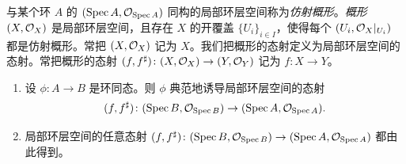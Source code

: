 与某个环 $A$ 的 $(\operatorname{Spec} A,\mathcal{O}_{\operatorname{Spec} A})$ 同构的局部环层空间称为\emph{仿射概形}。\emph{概形} $(X,\mathcal{O}_X)$ 是局部环层空间，且存在 $X$ 的开覆盖 $\{U_i\}_{i\in I}$，使得每个 $(U_i,\mathcal{O}_X|_{U_i})$ 都是仿射概形。常把 $(X,\mathcal{O}_X)$ 记为 $X$。我们把概形的态射定义为局部环层空间的态射。常把概形的态射 $(f,f^\sharp)\colon(X,\mathcal{O}_X)\to(Y,\mathcal{O}_Y)$ 记为 $f\colon X\to Y$。

\begin{proposition}\label{it:1.2.5}
\begin{enumerate}[label=(\roman*)]
  \item 设 $\phi\colon A\to B$ 是环同态。则 $\phi$ 典范地诱导局部环层空间的态射
  \[
  (f,f^\sharp)\colon(\operatorname{Spec} B,\mathcal{O}_{\operatorname{Spec} B})\to(\operatorname{Spec} A,\mathcal{O}_{\operatorname{Spec} A}).
  \]
  \item 局部环层空间的任意态射 $(f,f^\sharp)\colon(\operatorname{Spec} B,\mathcal{O}_{\operatorname{Spec} B})\to(\operatorname{Spec} A,\mathcal{O}_{\operatorname{Spec} A})$ 都由此得到。
\end{enumerate}
\end{proposition}

